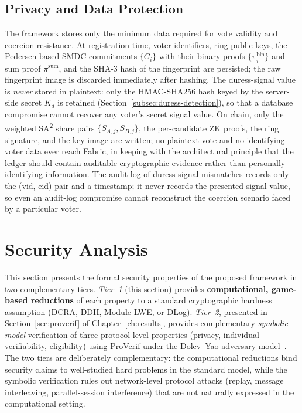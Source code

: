 \subsection{Privacy and Data Protection}
The framework stores only the minimum data required for vote validity and coercion resistance. At registration time, voter identifiers, ring public keys, the Pedersen-based SMDC commitments $\{C_i\}$ with their binary proofs $\{\pi^{\text{bin}}_i\}$ and sum proof $\pi^{\text{sum}}$, and the SHA-3 hash of the fingerprint are persisted; the raw fingerprint image is discarded immediately after hashing. The duress-signal value is \emph{never} stored in plaintext: only the HMAC-SHA256 hash keyed by the server-side secret $K_d$ is retained (Section~\ref{subsec:duress-detection}), so that a database compromise cannot recover any voter's secret signal value. On chain, only the weighted SA\textsuperscript{2} share pairs $\{S_{A,j}, S_{B,j}\}$, the per-candidate ZK proofs, the ring signature, and the key image are written; no plaintext vote and no identifying voter data ever reach Fabric, in keeping with the architectural principle that the ledger should contain auditable cryptographic evidence rather than personally identifying information. The audit log of duress-signal mismatches records only the (vid, eid) pair and a timestamp; it never records the presented signal value, so even an audit-log compromise cannot reconstruct the coercion scenario faced by a particular voter.

\section{Security Analysis}
\label{sec:security-analysis}

This section presents the formal security properties of the proposed framework in two complementary tiers. \emph{Tier~1} (this section) provides \textbf{computational, game-based reductions} of each property to a standard cryptographic hardness assumption (DCRA, DDH, Module-LWE, or DLog). \emph{Tier~2}, presented in Section~\ref{sec:proverif} of Chapter~\ref{ch:results}, provides complementary \emph{symbolic-model} verification of three protocol-level properties (privacy, individual verifiability, eligibility) using ProVerif under the Dolev--Yao adversary model~\cite{dolev1983}. The two tiers are deliberately complementary: the computational reductions bind security claims to well-studied hard problems in the standard model, while the symbolic verification rules out network-level protocol attacks (replay, message interleaving, parallel-session interference) that are not naturally expressed in the computational setting.

